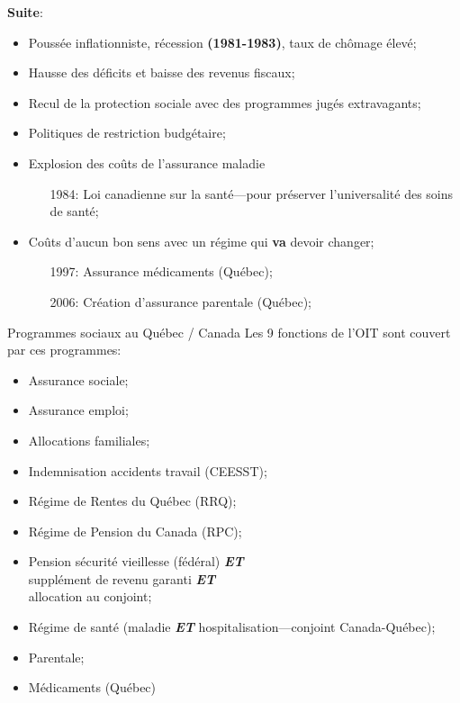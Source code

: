 \documentclass[10pt, french]{article}
\begin{document}
\begin{multicols*}{3}
\textbf{Suite}:
\begin{itemize}
	\item	Poussée inflationniste, récession \textbf{(1981-1983)}, taux de chômage élevé;
	\item	Hausse des déficits et baisse des revenus fiscaux;
	\item	Recul de la protection sociale avec des programmes jugés extravagants;
	\item	Politiques de restriction budgétaire;
	\item	Explosion des coûts de l'assurance maladie
		\begin{itemize}
		\item[1984: ]	Loi canadienne sur la santé---pour préserver l'universalité des soins de santé;
		\end{itemize}
	\item	Coûts d'aucun \og bon sens \fg{} avec un régime qui \textbf{va} devoir changer;
		\begin{itemize}
		\item[1997:]	Assurance médicaments (Québec);
		\item[2006:]	Création d'assurance parentale (Québec);
		\end{itemize}
\end{itemize}


\begin{conceptgen}{Programmes sociaux au Québec / Canada}
Les 9 fonctions de l'OIT sont couvert par ces programmes:
\begin{itemize}
	\item	Assurance sociale;
	\item	Assurance emploi;
	\item	Allocations familiales;
	\item	Indemnisation accidents travail (CEESST);
	\item	Régime de Rentes du Québec (RRQ);
	\item	Régime de Pension du Canada (RPC);
	\item	Pension sécurité vieillesse (fédéral) \textbf{\textit{ET}}\\ supplément de revenu garanti \textbf{\textit{ET}}\\ allocation au conjoint;
	\item	Régime de santé (maladie \textbf{\textit{ET}} hospitalisation---conjoint Canada-Québec);
	\item	Parentale;
	\item	Médicaments (Québec)
\end{itemize}
\end{conceptgen}


\end{multicols*}
\end{document}
